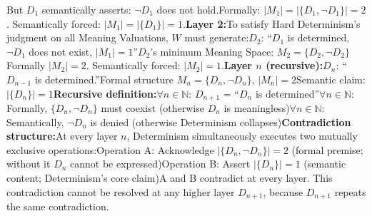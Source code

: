 \documentclass[11pt]{article}
\renewcommand{\\}[1][\mynewlineskip]{\oldnewline[#1]}
\begin{document}
But $D_1$ semantically asserts: $\neg D_1$ does not hold.\\
Formally: $|M_1| = |\{D_1, \neg D_1\}| = 2$. \quad Semantically forced: $|M_1| = |\{D_1\}| = 1$.\\
\textbf{Layer 2:}\\
To satisfy Hard Determinism's judgment on all Meaning Valuations, $W$ must generate:\\
$D_2$: ``$D_1$ is determined, $\neg D_1$ does not exist, $|M_1| = 1$''\\
$D_2$'s minimum Meaning Space: $M_2 = \{D_2, \neg D_2\}$\\
Formally $|M_2| = 2$. \quad Semantically forced: $|M_2| = 1$.\\
\textbf{Layer $n$ (recursive):}\\
$D_n$: ``$D_{n-1}$ is determined.''\\
Formal structure $M_n = \{D_n, \neg D_n\}$, \quad $|M_n| = 2$\\
Semantic claim: $|\{D_n\}| = 1$\\
\textbf{Recursive definition:}\\
$\forall n \in \mathbb{N}$: \quad $D_{n+1}$ = ``$D_n$ is determined''\\
$\forall n \in \mathbb{N}$: \quad Formally, $\{D_n, \neg D_n\}$ must coexist (otherwise $D_n$ is meaningless)\\
$\forall n \in \mathbb{N}$: \quad Semantically, $\neg D_n$ is denied (otherwise Determinism collapses)\\
\textbf{Contradiction structure:}\\
At every layer $n$, Determinism simultaneously executes two mutually exclusive operations:\\
Operation A: Acknowledge $|\{D_n, \neg D_n\}| = 2$ (formal premise; without it $D_n$ cannot be expressed)\\
Operation B: Assert $|\{D_n\}| = 1$ (semantic content; Determinism's core claim)\\
A and B contradict at every layer. This contradiction cannot be resolved at any higher layer $D_{n+1}$, because $D_{n+1}$ repeats the same contradiction.
\end{document}
